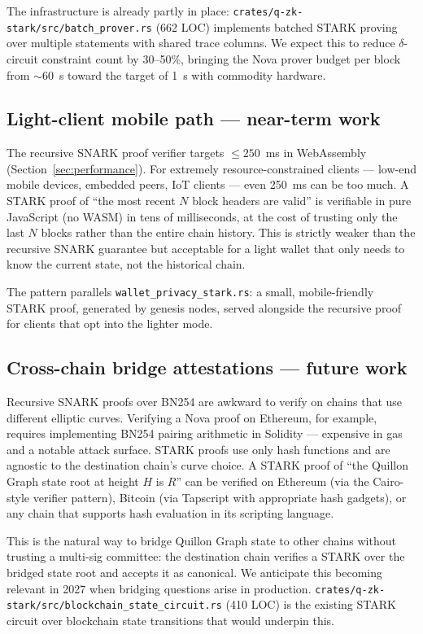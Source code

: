 \documentclass[11pt,a4paper]{article}
\begin{document}
The infrastructure is already partly in place:
\texttt{crates/q-zk-stark/src/batch\_prover.rs} (662 LOC) implements
batched STARK proving over multiple statements with shared trace
columns. We expect this to reduce $\delta$-circuit constraint count
by 30--50\%, bringing the Nova prover budget per block from $\sim$60~s
toward the target of 1~s with commodity hardware.

\subsection{Light-client mobile path --- near-term work}

The recursive SNARK proof verifier targets $\leq 250$~ms in WebAssembly
(Section~\ref{sec:performance}). For extremely resource-constrained
clients --- low-end mobile devices, embedded peers, IoT clients ---
even 250~ms can be too much. A STARK proof of ``the most recent $N$
block headers are valid'' is verifiable in pure JavaScript (no WASM)
in tens of milliseconds, at the cost of trusting only the last $N$
blocks rather than the entire chain history. This is strictly weaker
than the recursive SNARK guarantee but acceptable for a light wallet
that only needs to know the current state, not the historical chain.

The pattern parallels \texttt{wallet\_privacy\_stark.rs}: a small,
mobile-friendly STARK proof, generated by genesis nodes, served alongside
the recursive proof for clients that opt into the lighter mode.

\subsection{Cross-chain bridge attestations --- future work}

Recursive SNARK proofs over BN254 are awkward to verify on chains that
use different elliptic curves. Verifying a Nova proof on Ethereum, for
example, requires implementing BN254 pairing arithmetic in Solidity ---
expensive in gas and a notable attack surface. STARK proofs use only
hash functions and are agnostic to the destination chain's curve
choice. A STARK proof of ``the Quillon Graph state root at height $H$
is $R$'' can be verified on Ethereum (via the Cairo-style verifier
pattern), Bitcoin (via Tapscript with appropriate hash gadgets), or any
chain that supports hash evaluation in its scripting language.

This is the natural way to bridge Quillon Graph state to other chains
without trusting a multi-sig committee: the destination chain verifies
a STARK over the bridged state root and accepts it as canonical. We
anticipate this becoming relevant in 2027 when bridging questions arise
in production. \texttt{crates/q-zk-stark/src/blockchain\_state\_circuit.rs}
(410 LOC) is the existing STARK circuit over blockchain state transitions
that would underpin this.
\end{document}
